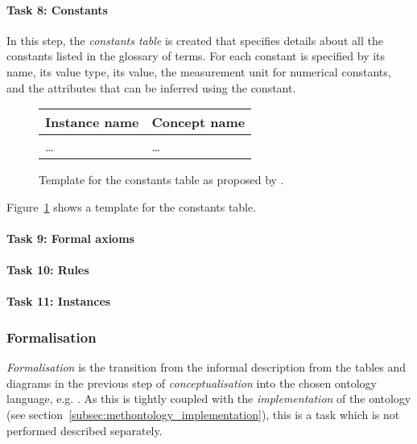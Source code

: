 \paragraph{Task 8: Constants}

In this step, the \emph{constants table} is created that specifies details about all the constants listed in the glossary of terms. For each constant is specified by its name, its value type, its value, the measurement unit for numerical constants, and the attributes that can be inferred using the constant.

\begin{figure}
\centering
\begin{tabular}{|p{}|p{}|}
  \hline
  \textbf{Instance name} & \textbf{Concept name} \\
  \hline\hline
  … & … \\
  \hline
\end{tabular}
\caption{Template for the constants table as proposed by \methontology.}
\label{fig:methontology_example_constants}
\end{figure}

Figure~\ref{fig:methontology_example_constants} shows a template for the constants table.

\paragraph{Task 9: Formal axioms}



\paragraph{Task 10: Rules}



\paragraph{Task 11: Instances}


\subsubsection{Formalisation}

\emph{Formalisation} is the transition from the informal description from the tables and diagrams in the previous step of \emph{conceptualisation} into the chosen ontology language, e.g. . As this is tightly coupled with the \emph{implementation} of the ontology (see section~\ref{subsec:methontology_implementation}), this is a task which is not performed described separately.

